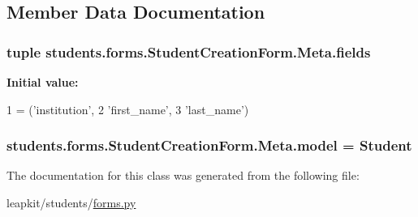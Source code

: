 \subsection{Member Data Documentation}
\hypertarget{classstudents_1_1forms_1_1_student_creation_form_1_1_meta_a7ebad25429c662d6ca0793ac8fbb3fed}{
\subsubsection[{fields}]{\setlength{\rightskip}{0pt plus 5cm}tuple students.\-forms.\-Student\-Creation\-Form.\-Meta.\-fields\hspace{0.3cm}{\ttfamily [static]}}}\label{classstudents_1_1forms_1_1_student_creation_form_1_1_meta_a7ebad25429c662d6ca0793ac8fbb3fed}
{\bfseries Initial value\-:}
\begin{DoxyCode}
1 = (\textcolor{stringliteral}{'institution'},
2                   \textcolor{stringliteral}{'first\_name'},
3                   \textcolor{stringliteral}{'last\_name'})
\end{DoxyCode}
\hypertarget{classstudents_1_1forms_1_1_student_creation_form_1_1_meta_a0d17a78a3c180d59e19729155599b5f7}{
\subsubsection[{model}]{\setlength{\rightskip}{0pt plus 5cm}students.\-forms.\-Student\-Creation\-Form.\-Meta.\-model = Student\hspace{0.3cm}{\ttfamily [static]}}}\label{classstudents_1_1forms_1_1_student_creation_form_1_1_meta_a0d17a78a3c180d59e19729155599b5f7}


The documentation for this class was generated from the following file\-:\begin{DoxyCompactItemize}
\item 
leapkit/students/\hyperlink{forms_8py}{forms.\-py}\end{DoxyCompactItemize}
